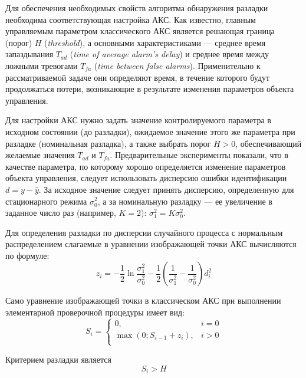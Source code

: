 
Для обеспечения необходимых свойств алгоритма обнаружения разладки
необходима соответствующая настройка АКС. Как известно, главным
управляемым параметром классического АКС является решающая граница
(порог) $H$ ({\em threshold}), а основными характеристиками ---
среднее время запаздывания $T_{ad}$ ({\em time of average alarm's
  delay}) и среднее время между ложными тревогами $T_{fa}$ ({\em time
  between false alarms}).  Применительно к рассматриваемой задаче они
определяют время, в течение которого будут продолжаться потери,
возникающие в результате изменения параметров объекта управления.

Для настройки АКС нужно задать значение контролируемого параметра в
исходном состоянии (до разладки), ожидаемое значение этого же
параметра при разладке (номинальная разладка), а также выбрать порог
$H>0$, обеспечивающий желаемые значения $T_{ad}$ и
$T_{fa}$. Предварительные эксперименты показали, что в качестве
параметра, по которому хорошо определяется изменение параметров
объекта управления, следует использовать дисперсию ошибки
идентификации $d=y-\hat{y}$.  За исходное значение следует принять
дисперсию, определенную для стационарного режима $\sigma^2_0$, а за
номинальную разладку --- ее увеличение в заданное число раз (например,
$K=2$): $\sigma^2_1=K\sigma^2_0$.

Для определения разладки по дисперсии случайного процесса с нормальным
распределением слагаемые в уравнении изображающей точки АКС
вычисляются по формуле:
\begin{equation}
  z_i=-\frac{1}{2}\ln\frac{\sigma^2_1}{\sigma^2_0}-\frac{1}{2}
  \left(\frac{1}{\sigma^2_1}-\frac{1}{\sigma^2_0}\right)d_i^2
\end{equation}

Само уравнение изображающей точки в классическом АКС при выполнении
элементарной проверочной процедуры имеет вид:
\begin{equation}
  S_i=\left\{
  \begin{array}{ll}
    0, & i=0\\
    \max\left(0; S_{i-1}+z_i\right), & i>0\\
  \end{array}\right.
\end{equation}

Критерием разладки является
\begin{equation}
  S_i>H
\end{equation}

